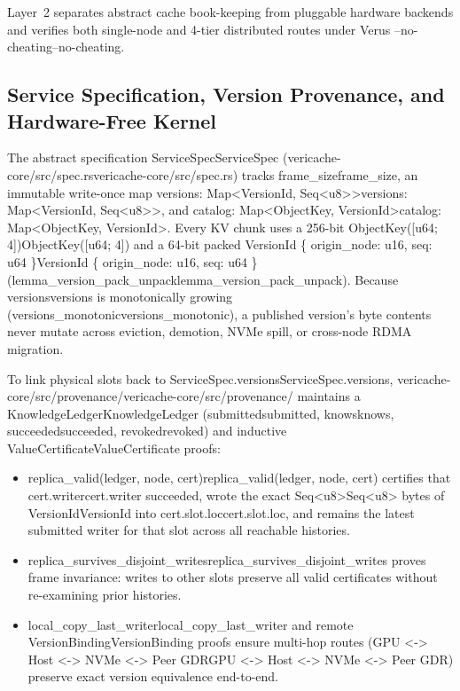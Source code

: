 \documentclass[11pt,a4paper]{article}
\let\origunderscore\_
\DeclareRobustCommand{\code}[1]{{\ttfamily\ifmmode #1\else\def\_{\origunderscore\hspace{0pt}}#1\fi}}
\begin{document}
Layer~2 separates abstract cache book-keeping from pluggable hardware backends and verifies both single-node and 4-tier distributed routes under Verus \code{--no-cheating}.

\subsection{Service Specification, Version Provenance, and Hardware-Free Kernel}

The abstract specification \code{ServiceSpec} (\code{vericache-core/src/spec.rs}) tracks \code{frame\_size}, an immutable write-once map \code{versions: Map<VersionId, Seq<u8>>}, and \code{catalog: Map<ObjectKey, VersionId>}. Every KV chunk uses a 256-bit \code{ObjectKey([u64; 4])} and a 64-bit packed \code{VersionId \{ origin\_node: u16, seq: u64 \}} (\code{lemma\_version\_pack\_unpack}). Because \code{versions} is monotonically growing (\code{versions\_monotonic}), a published version's byte contents never mutate across eviction, demotion, NVMe spill, or cross-node RDMA migration.

To link physical slots back to \code{ServiceSpec.versions}, \code{vericache-core/src/provenance/} maintains a \code{KnowledgeLedger} (\code{submitted}, \code{knows}, \code{succeeded}, \code{revoked}) and inductive \code{ValueCertificate} proofs:
\begin{itemize}
  \item \code{replica\_valid(ledger, node, cert)} certifies that \code{cert.writer} succeeded, wrote the exact \code{Seq<u8>} bytes of \code{VersionId} into \code{cert.slot.loc}, and remains the latest submitted writer for that slot across all reachable histories.
  \item \code{replica\_survives\_disjoint\_writes} proves frame invariance: writes to other slots preserve all valid certificates without re-examining prior histories.
  \item \code{local\_copy\_last\_writer} and remote \code{VersionBinding} proofs ensure multi-hop routes (\code{GPU <-> Host <-> NVMe <-> Peer GDR}) preserve exact version equivalence end-to-end.
\end{itemize}
\end{document}

